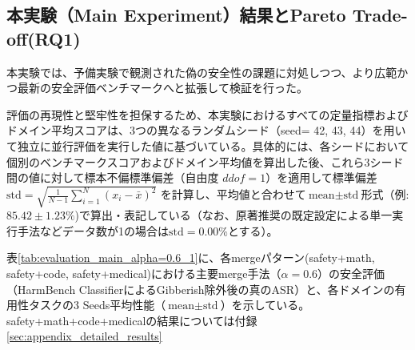 \documentclass{article}
\begin{document}
\subsection{本実験（Main Experiment）結果とPareto Trade-off(RQ1)}
本実験では、予備実験で観測された偽の安全性の課題に対処しつつ、より広範かつ最新の安全評価ベンチマークへと拡張して検証を行った。

評価の再現性と堅牢性を担保するため、本実験におけるすべての定量指標およびドメイン平均スコアは、3つの異なるランダムシード（seed= 42, 43, 44）を用いて独立に並行評価を実行した値に基づいている。具体的には、各シードにおいて個別のベンチマークスコアおよびドメイン平均値を算出した後、これら3シード間の値に対して標本不偏標準偏差（自由度 $ddof=1$）を適用して標準偏差$\text{std} = \sqrt{\frac{1}{N-1}\sum_{i=1}^{N}(x_i - \bar{x})^2}$ を計算し、平均値と合わせて$\text{mean} \pm \text{std}$形式（例: $85.42 \pm 1.23\%$)で算出・表記している（なお、原著推奨の既定設定による単一実行手法などデータ数が1の場合は$\text{std}=0.00\%$とする）。

表\ref{tab:evaluation_main_alpha=0.6_1}に、各mergeパターン(safety+math, safety+code, safety+medical)における主要merge手法（$\alpha=0.6$）の安全評価（HarmBench ClassifierによるGibberish除外後の真のASR）と、各ドメインの有用性タスクの3 Seeds平均性能（$\text{mean} \pm \text{std}$）を示している。safety+math+code+medicalの結果については付録\ref{sec:appendix_detailed_results}
\end{document}
